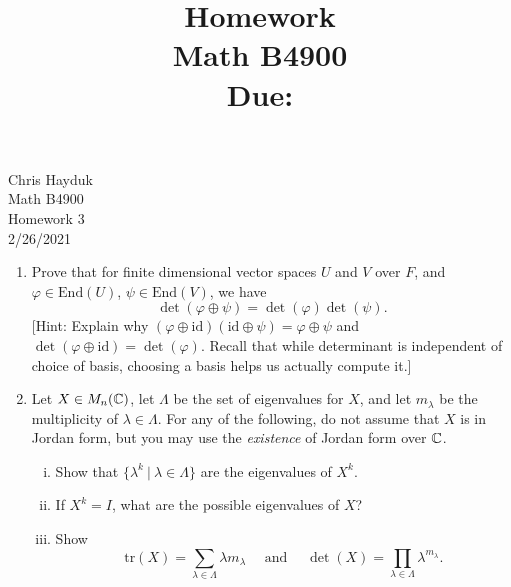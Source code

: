 \documentclass[11pt, reqno]{amsart}
\title[Homework \HW]{Homework \HW \\
Math B4900\\
\small Due: \DUE}
\author{}
\theoremstyle{plain}
\theoremstyle{definition}
\theoremstyle{example}
\def\End{\mathrm{End}}
\def\id{\mathrm{id}}
\def\tr{\mathrm{tr}}
\def\f{\varphi}
\def\HW{3}
\def\DUE{2/26/2021}
\begin{document}
\begin{flushright}
Chris Hayduk\\
Math B4900\\
Homework \HW\\
\DUE
\end{flushright}



\begin{enumerate}[1.]
\item Prove that for finite dimensional vector spaces $U$ and $V$ over $F$, and $\f \in \End(U)$, $\psi \in \End(V)$, we have 
$$\det( \f \oplus \psi) = \det(\f)\det(\psi).$$
{[Hint: Explain why $(\f \oplus \id)(\id \oplus \psi) = \f \oplus \psi$ and $\det(\f \oplus \id)= \det(\f)$. Recall that while determinant is independent of choice of basis, choosing a basis helps us actually compute it.]}


\item  Let $X \in M_n(\mathbb{C})$, let $\Lambda$ be the set of eigenvalues for $X$, and let $m_\lambda$ be the multiplicity of $\lambda \in \Lambda$. For any of the following, do not assume that $X$ is in Jordan form, but you may use the \emph{existence} of Jordan form over $\mathbb{C}$.
\begin{enumerate}[(i)]
\item Show that $\{\lambda^k ~|~ \lambda \in \Lambda\}$ are the eigenvalues of $X^k$.
\item If $X^k = I$, what are the possible eigenvalues of $X$?
\item Show 
$$\tr(X) = \sum_{\lambda \in \Lambda} \lambda m_\lambda
	\quad \text{ and } \quad 
	\det(X) = \prod _{\lambda \in \Lambda} \lambda^{m_\lambda}.$$
\end{enumerate}


\end{enumerate}
\end{document}
